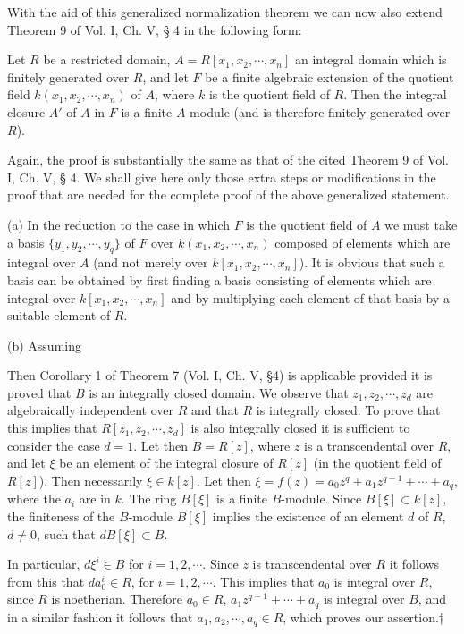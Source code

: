 With the aid of this generalized normalization theorem we can now also extend Theorem 9 of Vol. I, Ch. V, § 4 in the following form:

Let $R$ be a restricted domain, $A=R[x_1, x_2, \cdots, x_n]$ an integral domain which is finitely generated over $R$, and let $F$ be a finite algebraic extension of the quotient field $k(x_1, x_2, \cdots, x_n)$ of $A$, where $k$ is the quotient field of $R$. Then the integral closure $A'$ of $A$ in $F$ is a finite $A$-module (and is therefore finitely generated over $R$).

Again, the proof is substantially the same as that of the cited Theorem 9 of Vol. I, Ch. V, § 4. We shall give here only those extra steps or modifications in the proof that are needed for the complete proof of the above generalized statement.

(a) In the reduction to the case in which $F$ is the quotient field of $A$ we must take a basis $\{y_1, y_2, \cdots, y_q\}$ of $F$ over $k(x_1, x_2, \cdots, x_n)$ composed of elements which are integral over $A$ (and not merely over $k[x_1, x_2, \cdots, x_n]$). It is obvious that such a basis can be obtained by first finding a basis consisting of elements which are integral over $k[x_1, x_2, \cdots, x_n]$ and by multiplying each element of that basis by a suitable element of $R$.

(b) Assuming

Then Corollary 1 of Theorem 7 (Vol. I, Ch. V, §4) is applicable provided it is proved that $B$ is an integrally closed domain. We observe that $z_1, z_2, \cdots, z_d$ are algebraically independent over $R$ and that $R$ is integrally closed. To prove that this implies that $R[z_1, z_2, \cdots, z_d]$ is also integrally closed it is sufficient to consider the case $d=1$. Let then $B=R[z]$, where $z$ is a transcendental over $R$, and let $\xi$ be an element of the integral closure of $R[z]$ (in the quotient field of $R[z]$). Then necessarily $\xi \in k[z]$. Let then $\xi=f(z)=a_0z^q+a_1z^{q-1}+\cdots+a_q$, where the $a_i$ are in $k$. The ring $B[\xi]$ is a finite $B$-module. Since $B[\xi] \subset k[z]$, the finiteness of the $B$-module $B[\xi]$ implies the existence of an element $d$ of $R$, $d \neq 0$, such that $dB[\xi] \subset B$.

In particular, $d\xi^i \in B$ for $i=1, 2, \cdots$. Since $z$ is transcendental over $R$ it follows from this that $da_0^i \in R$, for $i=1, 2, \cdots$. This implies that $a_0$ is integral over $R$, since $R$ is noetherian. Therefore $a_0 \in R$, $a_1z^{q-1}+\cdots+a_q$ is integral over $B$, and in a similar fashion it follows that $a_1, a_2, \cdots, a_q \in R$, which proves our assertion.†

